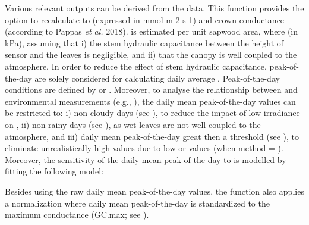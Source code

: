 \documentclass[a4paper]{book}
\begin{document}
\begin{Details}\relax
Various relevant outputs can be derived from the  data.
This function provides the option to recalculate  to  (expressed in mmol m-2 s-1)
and crown conductance (according to Pappas \emph{et al.} 2018).
 is estimated per unit sapwood area, where  (in kPa), assuming that
i) the stem hydraulic capacitance between the height of sensor and the leaves is negligible, and
ii) that the canopy is well coupled to the atmosphere. In order to reduce the effect of stem hydraulic capacitance,
peak-of-the-day  are solely considered for calculating daily average .
Peak-of-the-day conditions are defined by  or . Moreover, to analyse the relationship between 
and environmental measurements (e.g., ), the daily mean peak-of-the-day  values can be restricted to:
i) non-cloudy days (see ), to reduce the impact of low irradiance on ,
ii) non-rainy days (see ), as wet leaves are not well coupled to the atmosphere, and
iii) daily mean peak-of-the-day  great then a threshold (see ),
to eliminate unrealistically high  values due to low  or  values (when method = ).
Moreover, the sensitivity of the daily mean peak-of-the-day  to  is modelled by fitting the following model:


Besides using the raw daily mean peak-of-the-day  values, the function also applies
a normalization where daily mean peak-of-the-day  is standardized to the maximum conductance (GC.max; see ).
\end{Details}
%
\end{document}
